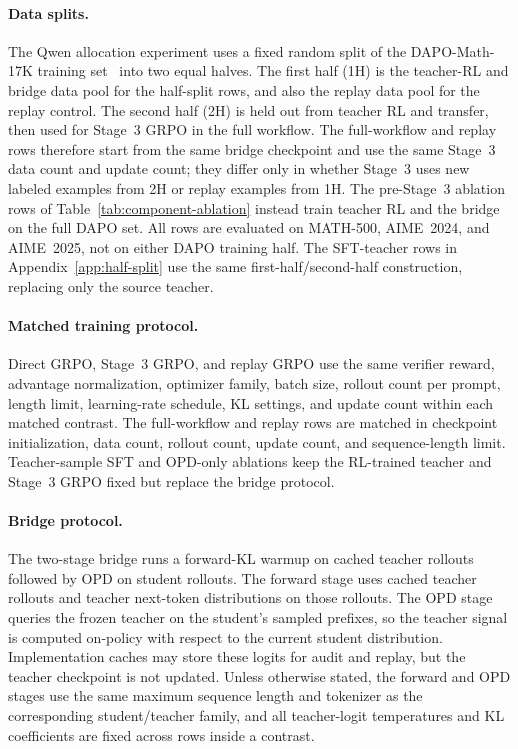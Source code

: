 \documentclass{article}
\begin{document}
\paragraph{Data splits.} The Qwen allocation experiment uses a fixed random split of the DAPO-Math-17K training set~\citep{yu2025dapo} into two equal halves. The first half (1H) is the teacher-RL and bridge data pool for the half-split rows, and also the replay data pool for the replay control. The second half (2H) is held out from teacher RL and transfer, then used for Stage~3 GRPO in the full workflow. The full-workflow and replay rows therefore start from the same bridge checkpoint and use the same Stage~3 data count and update count; they differ only in whether Stage~3 uses new labeled examples from 2H or replay examples from 1H. The pre-Stage~3 ablation rows of Table~\ref{tab:component-ablation} instead train teacher RL and the bridge on the full DAPO set. All rows are evaluated on MATH-500, AIME~2024, and AIME~2025, not on either DAPO training half. The SFT-teacher rows in Appendix~\ref{app:half-split} use the same first-half/second-half construction, replacing only the source teacher.

\paragraph{Matched training protocol.} Direct GRPO, Stage~3 GRPO, and replay GRPO use the same verifier reward, advantage normalization, optimizer family, batch size, rollout count per prompt, length limit, learning-rate schedule, KL settings, and update count within each matched contrast. The full-workflow and replay rows are matched in checkpoint initialization, data count, rollout count, update count, and sequence-length limit. Teacher-sample SFT and OPD-only ablations keep the RL-trained teacher and Stage~3 GRPO fixed but replace the bridge protocol.

\paragraph{Bridge protocol.} The two-stage bridge runs a forward-KL warmup on cached teacher rollouts followed by OPD on student rollouts. The forward stage uses cached teacher rollouts and teacher next-token distributions on those rollouts. The OPD stage queries the frozen teacher on the student's sampled prefixes, so the teacher signal is computed on-policy with respect to the current student distribution. Implementation caches may store these logits for audit and replay, but the teacher checkpoint is not updated. Unless otherwise stated, the forward and OPD stages use the same maximum sequence length and tokenizer as the corresponding student/teacher family, and all teacher-logit temperatures and KL coefficients are fixed across rows inside a contrast.
\end{document}

